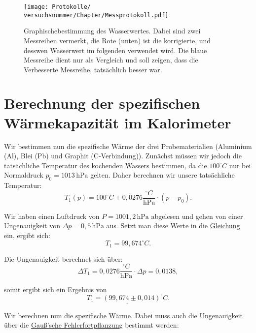 \onecolumn
\begin{figure}
    \centering
    \texttt{[image: Protokolle/\\versuchsnummer/Chapter/Messprotokoll.pdf]}
    \caption{Graphischebestimmung des Wasserwertes. Dabei sind zwei Messreihen vermerkt, die Rote (unten) ist die korrigierte, und desswen Wasserwert im folgenden verwendet wird. Die blaue Messreihe dient nur als Vergleich und soll zeigen, dass die Verbesserte Messreihe, tatsächlich besser war.}
    \label{fig:temp_against_time}
\end{figure}
\twocolumn



\section{Berechnung der spezifischen Wärmekapazität im Kalorimeter}
Wir bestimmen nun die spezifische Wärme der drei Probematerialien (Aluminium (Al), Blei (Pb) und Graphit (C-Verbindung)). 
Zunächst müssen wir jedoch die tatsächliche Temperatur des kochenden Wassers bestimmen, da die $100^\circ C$ nur bei Normaldruck $p_0 = 1013 \, \mathrm{hPa}$ gelten.
Daher berechnen wir unsere tatsächliche Temperatur:
\begin{equation}
    T_1(p) = 100^\circ C + 0,0276 \frac{^\circ C}{\mathrm{hPa}} \cdot (p-p_0).
    \label{eq:temp_corecctur}
\end{equation}

Wir haben einen Luftdruck von $P = 1001,2 \, \mathrm{hPa}$ abgelesen und gehen von einer Ungenauigkeit von $\Delta p = 0,5 \, \mathrm{hPa}$ aus.
Setzt man diese Werte in die \hyperref[eq:temp_corecctur]{Gleichung} ein, ergibt sich:
\begin{equation}    
    T_1 = 99,674 ^\circ C.
\end{equation}

Die Ungenauigkeit berechnet sich über:
\begin{equation}
    \Delta T_1 = 0,0276 \frac{^\circ C}{\mathrm{hPa}} \cdot \Delta p = 0,0138,
\end{equation}

somit ergibt sich ein Ergebnis von
\begin{equation}
    \underline{T_1 = (99,674 \pm 0,014)^\circ C}.
\end{equation}

Wir berechnen nun die \hyperref[eq:spezifische_waermekapazitaet]{spezifische Wärme}. Dabei muss auch die Ungenauigkeit über die \hyperref[eq:gauss_fehlfortpflanzung]{Gauß'sche Fehlerfortpflanzung} bestimmt werden:

